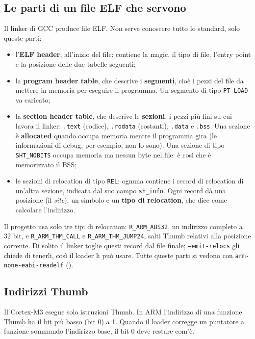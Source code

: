 \subsection{Le parti di un file ELF che servono}

Il linker di GCC produce file ELF. Non serve conoscere tutto lo standard, solo queste parti:
\begin{itemize}
\item l'\textbf{ELF header}, all'inizio del file: contiene la magic, il tipo di file, l'entry point e la posizione delle due tabelle seguenti;
\item la \textbf{program header table}, che descrive i \textbf{segmenti}, cioè i pezzi del file da mettere in memoria per eseguire il programma. Un segmento di tipo \texttt{PT\_LOAD} va caricato;
\item la \textbf{section header table}, che descrive le \textbf{sezioni}, i pezzi più fini su cui lavora il linker: \texttt{.text} (codice), \texttt{.rodata} (costanti), \texttt{.data} e \texttt{.bss}. Una sezione è \textbf{allocated} quando occupa memoria mentre il programma gira (le informazioni di debug, per esempio, non lo sono). Una sezione di tipo \texttt{SHT\_NOBITS} occupa memoria ma nessun byte nel file: è così che è memorizzato il BSS;
\item le sezioni di relocation di tipo \texttt{REL}: ognuna contiene i record di relocation di un'altra sezione, indicata dal suo campo \texttt{sh\_info}. Ogni record dà una posizione (il \emph{site}), un simbolo e un \textbf{tipo di relocation}, che dice come calcolare l'indirizzo.
\end{itemize}

Il progetto usa solo tre tipi di relocation: \texttt{R\_ARM\_ABS32}, un indirizzo completo a 32 bit, e \texttt{R\_ARM\_THM\_CALL} e \texttt{R\_ARM\_THM\_JUMP24}, salti Thumb relativi alla posizione corrente. Di solito il linker toglie questi record dal file finale; \texttt{--emit-relocs} gli chiede di tenerli, così il loader li può usare. Tutte queste parti si vedono con \texttt{arm-none-eabi-readelf} ().

\subsection{Indirizzi Thumb}
Il Cortex-M3 esegue solo istruzioni Thumb. In ARM l'indirizzo di una funzione Thumb ha il bit più basso (bit 0) a 1. Quando il loader corregge un puntatore a funzione sommando l'indirizzo base, il bit 0 deve restare com'è.

